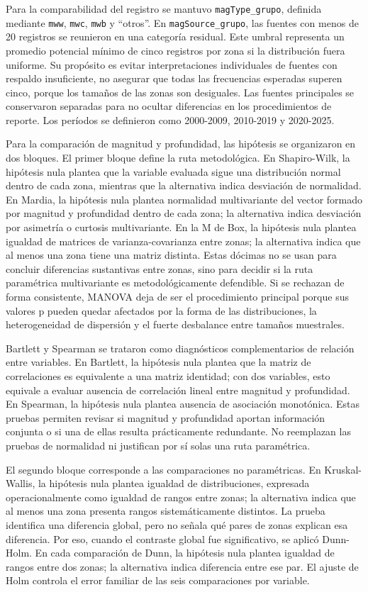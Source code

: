 \documentclass[
  spanish,
  letterpaper,
  DIV=11,
  numbers=noendperiod]{scrartcl}
\begin{document}
Para la comparabilidad del registro se mantuvo \texttt{magType\_grupo},
definida mediante \texttt{mww}, \texttt{mwc}, \texttt{mwb} y ``otros''.
En \texttt{magSource\_grupo}, las fuentes con menos de 20 registros se
reunieron en una categoría residual. Este umbral representa un promedio
potencial mínimo de cinco registros por zona si la distribución fuera
uniforme. Su propósito es evitar interpretaciones individuales de
fuentes con respaldo insuficiente, no asegurar que todas las frecuencias
esperadas superen cinco, porque los tamaños de las zonas son desiguales.
Las fuentes principales se conservaron separadas para no ocultar
diferencias en los procedimientos de reporte. Los períodos se definieron
como 2000-2009, 2010-2019 y 2020-2025.

Para la comparación de magnitud y profundidad, las hipótesis se
organizaron en dos bloques. El primer bloque define la ruta
metodológica. En Shapiro-Wilk, la hipótesis nula plantea que la variable
evaluada sigue una distribución normal dentro de cada zona, mientras que
la alternativa indica desviación de normalidad. En Mardia, la hipótesis
nula plantea normalidad multivariante del vector formado por magnitud y
profundidad dentro de cada zona; la alternativa indica desviación por
asimetría o curtosis multivariante. En la M de Box, la hipótesis nula
plantea igualdad de matrices de varianza-covarianza entre zonas; la
alternativa indica que al menos una zona tiene una matriz distinta.
Estas dócimas no se usan para concluir diferencias sustantivas entre
zonas, sino para decidir si la ruta paramétrica multivariante es
metodológicamente defendible. Si se rechazan de forma consistente,
MANOVA deja de ser el procedimiento principal porque sus valores p
pueden quedar afectados por la forma de las distribuciones, la
heterogeneidad de dispersión y el fuerte desbalance entre tamaños
muestrales.

Bartlett y Spearman se trataron como diagnósticos complementarios de
relación entre variables. En Bartlett, la hipótesis nula plantea que la
matriz de correlaciones es equivalente a una matriz identidad; con dos
variables, esto equivale a evaluar ausencia de correlación lineal entre
magnitud y profundidad. En Spearman, la hipótesis nula plantea ausencia
de asociación monotónica. Estas pruebas permiten revisar si magnitud y
profundidad aportan información conjunta o si una de ellas resulta
prácticamente redundante. No reemplazan las pruebas de normalidad ni
justifican por sí solas una ruta paramétrica.

El segundo bloque corresponde a las comparaciones no paramétricas. En
Kruskal-Wallis, la hipótesis nula plantea igualdad de distribuciones,
expresada operacionalmente como igualdad de rangos entre zonas; la
alternativa indica que al menos una zona presenta rangos
sistemáticamente distintos. La prueba identifica una diferencia global,
pero no señala qué pares de zonas explican esa diferencia. Por eso,
cuando el contraste global fue significativo, se aplicó Dunn-Holm. En
cada comparación de Dunn, la hipótesis nula plantea igualdad de rangos
entre dos zonas; la alternativa indica diferencia entre ese par. El
ajuste de Holm controla el error familiar de las seis comparaciones por
variable.
\end{document}
